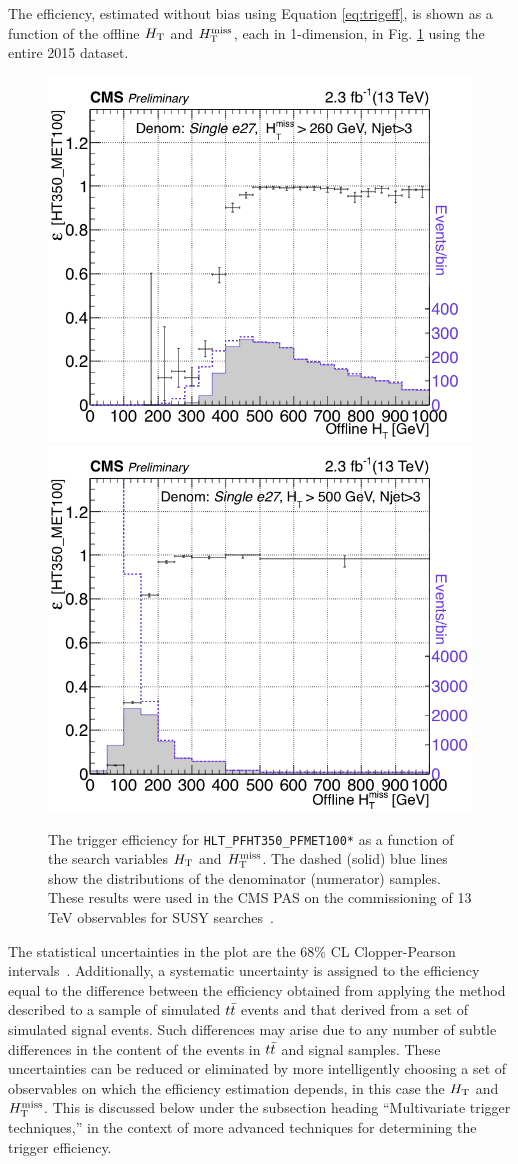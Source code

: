 The efficiency, estimated without bias using Equation \ref{eq:trigeff}, is shown as a function of the offline $H_{\rm T}$ and $H_{\text{T}}^{\rm miss}$, each in 1-dimension, in Fig. \ref{fig:trigger-turnon} using the entire 2015 dataset. 
\begin{figure}[tbp]
  \begin{center}
    \includegraphics[width=0.49\linewidth]{figures/trigger/EffVsHt2_3InvFb.png}
    \includegraphics[width=0.49\linewidth]{figures/trigger/EffVsMht2_3InvFb.png}
    \caption{
      The trigger efficiency for \texttt{HLT\_PFHT350\_PFMET100*} 
      as a function of the search variables $H_{\rm T}$ and $H_{\text{T}}^{\rm miss}$. The dashed (solid) blue
      lines show the distributions of the denominator (numerator) samples. These results were used in the CMS PAS on the commissioning of 13 TeV observables for SUSY searches~\cite{CMS-DP-2015-035}.
      }
    \label{fig:trigger-turnon}
  \end{center}
\end{figure}
The statistical uncertainties in the plot are the 68\% CL Clopper-Pearson
intervals~\cite{Clopper:Pearson}. Additionally, a systematic uncertainty is assigned to the efficiency
equal to the difference between the efficiency obtained from applying the method described to a
sample of simulated $t\bar{t}$ events and that derived
from a set of simulated signal events. Such differences may arise due to any number of subtle differences in the content of the events in $t\bar{t}$ and signal samples. These uncertainties can be reduced or eliminated by more intelligently choosing a set of observables on which the efficiency estimation depends, in this case the $H_{\rm T}$ and $H_{\text{T}}^{\rm miss}$. This is discussed below under the subsection heading ``Multivariate trigger techniques,'' in the context of more advanced techniques for determining the trigger efficiency. 
\FloatBarrier

